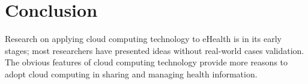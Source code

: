 \documentclass[10pt,a4paper]{article}
\begin{document}
\section{Conclusion}
Research on applying cloud computing technology to eHealth is in its early stages; most researchers have presented ideas without real-world cases validation. The obvious features of cloud computing technology provide more reasons to adopt cloud computing in sharing and managing health information. 


\end{document}
